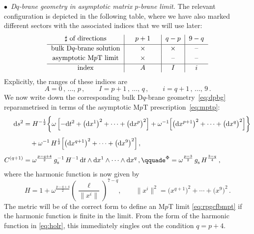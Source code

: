\documentclass[11pt]{article}
\newcommand{\be}{\begin{equation}}
\newcommand{\ee}{\end{equation}}
\renewcommand{\emph}[1]{\textit{#1}}
\newcommand{\dd}{\mathrm{d}}
\begin{document}
\noindent $\bullet$~\emph{D$q$-brane geometry in asymptotic matrix $p$-brane limit.} 
The relevant configuration is depicted in the following table, where we have also marked different sectors with the associated indices that we will use later:
%
\begin{equation*}
\begin{tabular}{c|c|c|c}
 $\sharp$ of directions & $\quad p+1\quad$ & $q-p$ & $9-q$ \\[2pt]
 \hline
 bulk D$q$-brane solution & $\times$ & $\times$ & -- \\[2pt]
asymptotic M$p$T limit & $\times$ & -- & -- \\[2pt]
    \hline
 index & $A$ & $I$ & $i$ 
\end{tabular}
\end{equation*}
%
Explicitly, the ranges of these indices are
%
\be
    A = 0\,,\,\dots,\,p\,, 
        \qquad%
    I = p+1\,,\, \dots, \, q\,, 
        \qquad%
    i = q+1\,, \, \dots, \, 9\,.
\ee
%
We now write down the corresponding bulk D$q$-brane geometry~\eqref{eq:dpbg} reparametrised in terms of the asymptotic M$p$T prescription~\eqref{eq:mptp}:
%
\begin{subequations} \label{eq:DqSoln_forlimit}
\begin{align}
    \dd s^2 & = H^{-\frac{1}{2}} \biggl\{ \omega \, \Bigl[ - \dd t^2 + \bigl(\dd x^1\bigr)^2 + \dots + \bigl(\dd x^p\bigr)^2 \Bigr] 
    + \omega^{-1} \Bigl[ \bigl( \dd x^{p+1} \bigr)^2+ \dots + \bigl( \dd x^{q} \bigr)^2 \Bigr] \biggr\} \notag\\[4pt]
        &%
    \quad + \omega^{-1} \, H^{\frac{1}{2}} \Bigl[ \bigl( \dd x^{q+1} \bigr)^2 +\dots + \bigl( \dd x^9 \bigr)^2 \Bigr] \,,\\[4pt]
    C^{(q+1)} & = \omega^{\frac{p-q+4}{2}} \, g_\text{s}^{-1} \, H^{-1} \, \dd t \wedge \dd x^1 \wedge \dots \wedge \dd x^q \,,
        \qquad%
    e^\Phi = \omega^{\frac{p-3}{2}} \, g^{}_\text{s} \, H^{\frac{3-q}{4}}\,,
\end{align}
\end{subequations}
%
where the harmonic function is now given by
%
\be \label{eq:holr}
    H = 1 +  \omega^{\frac{p-q+4}{2}} \! \left( \frac{\ell}{\| x^i \|} \right)^{\!\!7-q}\!\!,
        \qquad%
    \| x^i \|^2 = \bigl( x^{q+1} \bigr)^2 + \cdots + \bigl( x^9 \bigr)^2\,.
\ee
%
The metric will be of the correct form to define an M$p$T limit \eqref{eq:rpgcfbmpt} if the harmonic function is finite in the limit. 
From the form of the harmonic function in \eqref{eq:holr}, this immediately singles out the condition $q = p + 4$.
\end{document}
